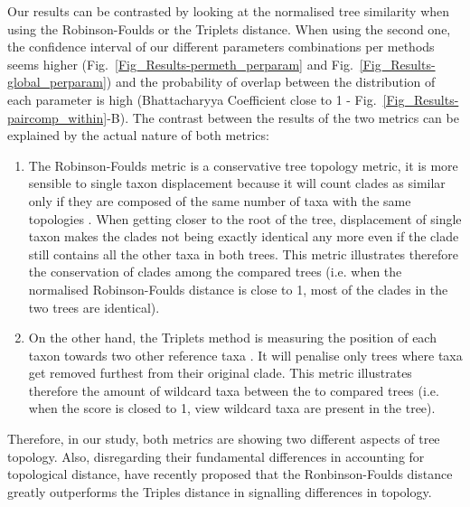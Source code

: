 \documentclass[12pt,letterpaper]{article}
\begin{document}

\label{metrics_discussion}
Our results can be contrasted by looking at the normalised tree similarity when using the Robinson-Foulds or the Triplets distance. When using the second one, the confidence interval of our different parameters combinations per methods seems higher (Fig.~\ref{Fig_Results-permeth_perparam} and Fig.~\ref{Fig_Results-global_perparam}) and the probability of overlap between the distribution of each parameter is high (Bhattacharyya Coefficient close to 1 - Fig.~\ref{Fig_Results-paircomp_within}-B). The contrast between the results of the two metrics can be explained by the actual nature of both metrics:
\begin{enumerate}
\item{The Robinson-Foulds metric is a conservative tree topology metric, it is more sensible to single taxon displacement because it will count clades as similar only if they are composed of the same number of taxa with the same topologies \citep{RF1981}. When getting closer to the root of the tree, displacement of single taxon makes the clades not being exactly identical any more even if the clade still contains all the other taxa in both trees. This metric illustrates therefore the conservation of clades among the compared trees (i.e. when the normalised Robinson-Foulds distance is close to 1, most of the clades in the two trees are identical).}
\item{On the other hand, the Triplets method is measuring the position of each taxon towards two other reference taxa \citep{critchlowthe1996}. It will penalise only trees where taxa get removed furthest from their original clade. This metric illustrates therefore the amount of wildcard taxa \citep{kearneyfragmentary2002} between the to compared trees (i.e. when the score is closed to 1, view wildcard taxa are present in the tree).}
\end{enumerate}
Therefore, in our study, both metrics are showing two different aspects of tree topology. Also, disregarding their fundamental differences in accounting for topological distance, \citet{kuhnerpractical2014} have recently proposed that the Ronbinson-Foulds distance greatly outperforms the Triples distance in signalling differences in topology.
\end{document}
